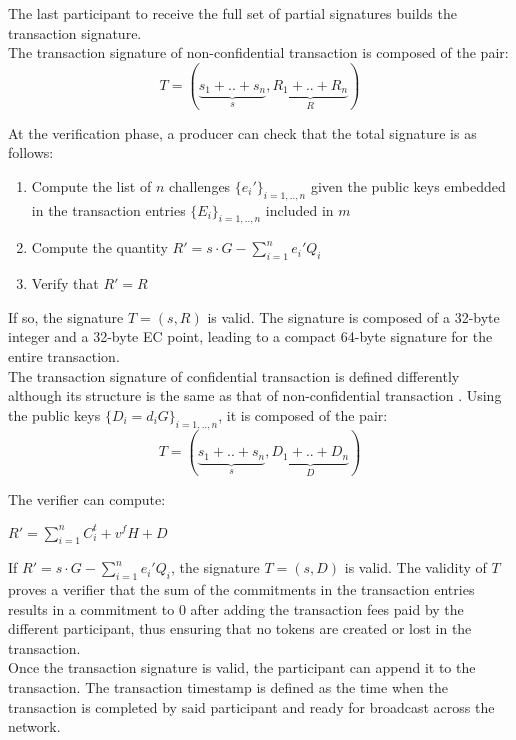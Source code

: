The last participant to receive the full set of partial signatures builds the transaction signature.\\

 The transaction signature of non-confidential transaction is composed of the pair:
\begin{equation} 
T= (\underbrace{s_{1}+..+s_{n}}_{s}, \underbrace{R_{1}+..+R_{n}}_{R})
\end{equation}

At the verification phase, a producer can check that the total signature is as follows:
\begin{enumerate}
\item Compute the list of $n$ challenges $\{e_i'\}_{i=1,..,n}$ given the public keys embedded in the transaction entries $\{E_i\}_{i=1,..,n}$ included in $m$
\item Compute the quantity $R' = s \cdot G - \sum_{i=1}^{n}e_i'Q_i$
\item Verify that $R'=R$
\end{enumerate}

If so, the signature $T = (s,R)$ is valid. The signature is composed of a 32-byte integer and a 32-byte EC point, leading to a compact 64-byte signature for the entire transaction. \\

The transaction signature of confidential transaction is defined differently although its structure is the same as that of non-confidential transaction . Using the public keys $\{D_i = d_iG\}_{i=1,..,n}$, it is composed of the pair:
\begin{equation} 
T= (\underbrace{s_{1}+..+s_{n}}_{s}, \underbrace{D_{1}+..+D_{n}}_{D})
\end{equation}

The verifier can compute:
\begin{center}
$R' = \sum_{i=1}^{n}C_i^t + v^fH + D$
\end{center}

If $R' = s \cdot G - \sum_{i=1}^{n}e_i'Q_i$, the signature $T = (s,D)$ is valid. The validity of $T$ proves a verifier that the sum of the commitments in the transaction entries results in a commitment to 0 after adding the transaction fees paid by the different participant, thus ensuring that no tokens are created or lost in the transaction. \\

Once the transaction signature is valid, the participant can append it to the transaction. The transaction timestamp is defined as the time when the transaction is completed by said participant and ready for broadcast across the network. 
